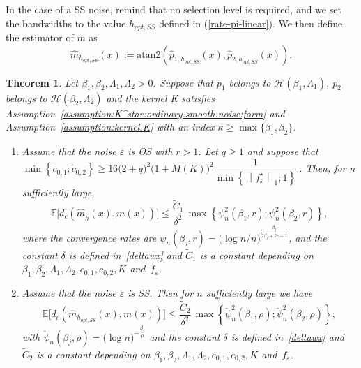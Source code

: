 \documentclass[11pt,a4paper,openany]{article}
\newtheorem{thm}{Theorem}[section]
\newcommand{\Atan}{\mbox{atan2}}
\def\E{\mathbb{E}}
\begin{document}
\noindent In the case of a SS  noise, remind that no selection level is required, and we set the bandwidths to the value $h_{opt, SS}$ defined in (\ref{rate-pi-linear}). We then define the estimator of $m$  as
$$
\widehat m_{h_{opt, SS}}(x) := \Atan (\hat p_{1, h_{opt, SS}}(x), \hat p_{2, h_{opt, SS} }(x)).
$$ 

\medskip

\begin{thm} \label{adaptive:thm:pointwise-risk.upper-bound:m}
	Let $\beta_{1} , \beta_{2} ,   \Lambda_{1}, \Lambda_{2} > 0$. Suppose that $p_{1}$ belongs to $\mathcal{H}(\beta_{1}, \Lambda_{1})$, $p_{2}$ belongs to $\mathcal{H}(\beta_{2}, \Lambda_{2})$ and the kernel K satisfies Assumption~\ref{assumption:K^star:ordinary.smooth.noise:form} and Assumption~\ref{assumption:kernel.K} with an index $\kappa \geq \max \big\{ \beta_{1}  , \beta_{2}  \big\}$.
	
	\begin{enumerate}
\item Assume that the noise ${\varepsilon}$ is OS with $r>1$.	 Let $q \geq 1$ and suppose that  $\min\left\{\tilde c_{0, 1} ; \tilde c_{0, 2}\right\} \geq 16 \big(2 + q \big)^{2}  \big( 1 + M(K) \big)^{2}  \dfrac{1}{ \min \left\{ \left\| f^{\star}_{\varepsilon}  \right\|_{1} ; 1 \right\} }~$. Then,  %
	for $n$ sufficiently large, 
	\begin{equation*}
		\E \Big[ d_c( \widehat{m}_{\widehat{h}}(x), m(x) )\Big]
		\leq \frac{\widetilde C_1}{\delta^2}  \,  \max \left\{    \psi_{n}^2(\beta_{1}, r) ;   \psi_{n}^2(\beta_{2}, r)\right\} , 
	\end{equation*}
	where 
	the convergence rates are $\psi_{n}(\beta_{j}, r) = \big( \log n/n \big)^{\frac{\beta_{j}}{2\beta_{j} + 2r+1}} $,  and the constant $\delta$ is defined in~\eqref{deltawx} and $\widetilde C_1$ is a constant depending on $\beta_{1},  \beta_{2},  \Lambda_{1},  \Lambda_{2},  c_{0,1}, c_{0,2},  K$ and~$f_{\varepsilon}$.

\item Assume that the noise ${\varepsilon}$ is SS. Then for $n$ sufficiently large we have 
\begin{equation*}
		\E \Big[ d_c( \widehat m_{h_{opt, SS}}(x) , m(x) )\Big]
		\leq \frac{\widetilde C_2}{\delta^2}  \,  \max \left\{     \check \psi_{n}^2(\beta_{1}, \rho) ;  \check  \psi_{n}^2(\beta_{2}, \rho)\right\} , 
	\end{equation*}
with $ \check \psi_{n}(\beta_{j}, \rho) = \big( \log n \big)^{ - \frac{\beta_{j}}{\rho} }$ and the constant $\delta$ is defined in~\eqref{deltawx} and $\widetilde C_2$ is a constant depending on $\beta_{1}, \beta_{2}, \Lambda_{1}, \Lambda_{2},c_{0,1}, c_{0,2}, K$ and~$f_{\varepsilon}$.
	\end{enumerate}
\end{thm}
\end{document}
